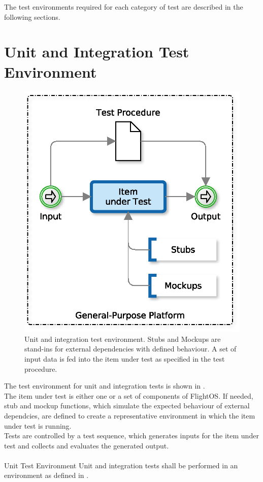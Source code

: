 \noindent
The test environments required for each category of test are described in the
following sections.

\newpage
\section{Unit and Integration Test Environment}

\begin{figure}[]
\begin{center}
	\includegraphics[width=0.5\columnwidth]{images/unittest}
	\caption{Unit and integration test environment. Stubs and Mockups %
	are stand-ins for external dependencies with defined behaviour. %
	A set of input data is fed into the item under test as specified %
	in the test procedure.}
	\label{fig:unittest}
\end{center}
\end{figure}

The test environment for unit and integration tests is shown in
.\\

\noindent
The item under test is either one or a set of components of FlightOS. If needed,
stub and mockup functions, which simulate the expected behaviour of external
dependcies, are defined to create a representative environment in which the item
under test is running.\\

\noindent
Tests are controlled by a test sequence, which generates inputs for the item
under test and collects and evaluates the generated output.\\
\\

 {Unit Test Environment}{%
Unit and integration tests shall be performed in an environment as defined in %
. %
}{}%


